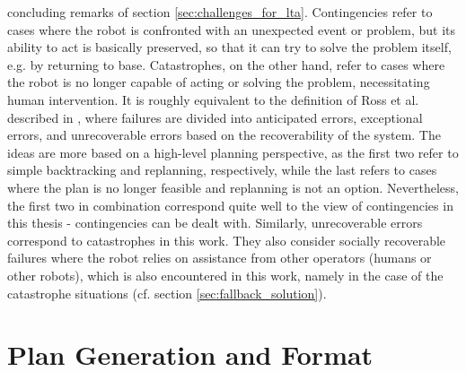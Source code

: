 \documentclass[english, master, utf8]{base/thesis_KBS}
\begin{document}
concluding remarks of section \ref{sec:challenges_for_lta}. Contingencies refer to cases where the robot is confronted with an unexpected event or problem, but its ability to act is
basically preserved, so that it can try to solve the problem itself, e.g. by returning to base. Catastrophes, on the other hand, refer to cases where the robot is no longer capable of
acting or solving the problem, necessitating human intervention. It is roughly equivalent to the definition of Ross et al. described in \cite{Honig:2018}, where
failures are divided into anticipated errors, exceptional errors, and unrecoverable errors based on the recoverability of the system. The ideas are more based on a high-level planning
perspective, as the first two refer to simple backtracking and replanning, respectively, while the last refers to cases where the plan is no longer feasible and replanning is not an
option. Nevertheless, the first two in combination correspond quite well to the view of contingencies in this thesis - contingencies can be dealt with. Similarly, unrecoverable errors
correspond to catastrophes in this work. They also consider socially recoverable failures where the robot relies on assistance from other operators (humans or other robots), which
is also encountered in this work, namely in the case of the catastrophe situations (cf. section \ref{sec:fallback_solution}).

\section{Plan Generation and Format}
\label{sec:plan_generation}
\end{document}
